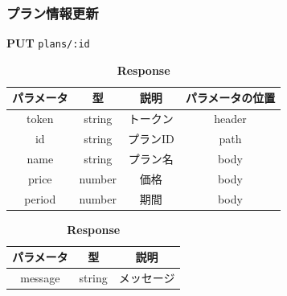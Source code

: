 \subsubsection*{プラン情報更新}
\textbf{PUT} \texttt{plans/:id}
\begin{table}[H]
  \begin{minipage}
    {0.5\hsize}
    \centering
    \captionsetup{labelformat=empty,labelsep=none} \caption{\textbf{Request}}
    \small
    \begin{tabular}{|c|c|c|c|} \hline
      パラメータ  & 型      & 説明    & パラメータの位置 \\ \hline \hline
      token  & string & トークン  & header   \\ \hline
      id     & string & プランID & path     \\ \hline
      name   & string & プラン名  & body     \\ \hline
      price  & number & 価格    & body     \\ \hline
      period & number & 期間    & body     \\ \hline
    \end{tabular}
  \end{minipage}
  \begin{minipage}
    {0.5\hsize} \centering \captionsetup{labelformat=empty,labelsep=none} \caption{\textbf{Response}}
    \begin{tabular}{|c|c|c|} \hline
      パラメータ   & 型      & 説明    \\ \hline \hline
      message & string & メッセージ \\ \hline
    \end{tabular}
  \end{minipage}
\end{table}

